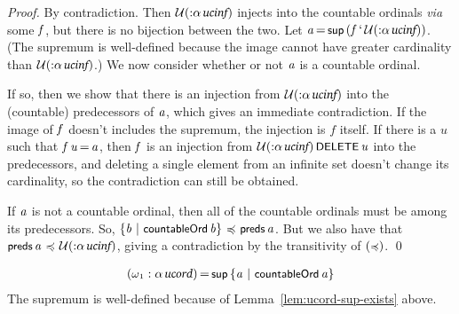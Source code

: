\documentclass[11pt]{llncs}
\renewcommand{\HOLConst}[1]{{\textsf{\upshape\small #1}}}
\renewcommand{\HOLTyOp}[1]{\mbox{\fontencoding{T1}\fontfamily{bch}\fontseries{m}\fontshape{it}\fontsize{9.5}{10}\selectfont #1}}
\renewcommand{\HOLinline}[1]{\ensuremath{#1}}
\newenvironment{holmath}{\begin{displaymath}\begin{array}{l}}{\end{array}\end{displaymath}\ignorespacesafterend}
\begin{document}
\begin{proof}
By contradiction.
Then \HOLinline{\ensuremath{\cal{U}}(\ensuremath{{:}}\ensuremath{\alpha}\,\HOLTyOp{ucinf})} injects into the countable ordinals \emph{via} some \HOLinline{\HOLFreeVar{f}}, but there is no bijection between the two.
Let \HOLinline{\HOLFreeVar{a}\,{\ensuremath{=}}\,\HOLConst{sup}\,(\HOLFreeVar{f}\,\textrm{`}\,\ensuremath{\cal{U}}(\ensuremath{{:}}\ensuremath{\alpha}\,\HOLTyOp{ucinf}))}.
(The supremum is well-defined because the image cannot have greater cardinality than \HOLinline{\ensuremath{\cal{U}}(\ensuremath{{:}}\ensuremath{\alpha}\,\HOLTyOp{ucinf})}.)
We now consider whether or not \HOLinline{\HOLFreeVar{a}} is a countable ordinal.

If so, then we show that there is an injection from \HOLinline{\ensuremath{\cal{U}}(\ensuremath{{:}}\ensuremath{\alpha}\,\HOLTyOp{ucinf})} into the (countable) predecessors of \HOLinline{\HOLFreeVar{a}}, which gives an immediate contradiction.
If the image of \HOLinline{\HOLFreeVar{f}} doesn't includes the supremum, the injection is $f$ itself.
If there is a $u$ such that \HOLinline{\HOLFreeVar{f}\,\HOLFreeVar{u}\,{\ensuremath{=}}\,\HOLFreeVar{a}}, then \HOLinline{\HOLFreeVar{f}} is an injection from \HOLinline{\ensuremath{\cal{U}}(\ensuremath{{:}}\ensuremath{\alpha}\,\HOLTyOp{ucinf})\,\HOLConst{DELETE}\,\HOLFreeVar{u}} into the predecessors, and deleting a single element from an infinite set doesn't change its cardinality, so the contradiction can still be obtained.

If \HOLinline{\HOLFreeVar{a}} is not a countable ordinal, then all of the countable ordinals must be among its predecessors.
So, \HOLinline{\ensuremath{{\{}}\HOLBoundVar{b}\,\ensuremath{{\,\mid\,}}\,\HOLConst{countableOrd}\,\HOLBoundVar{b}\ensuremath{{\}}}\,\ensuremath{{\,\HOLTokenIsPrefix\,}}\,\HOLConst{preds}\,\HOLFreeVar{a}}.
But we also have that \HOLinline{\HOLConst{preds}\,\HOLFreeVar{a}\,\ensuremath{{\,\HOLTokenIsPrefix\,}}\,\ensuremath{\cal{U}}(\ensuremath{{:}}\ensuremath{\alpha}\,\HOLTyOp{ucinf})}, giving a contradiction by the transitivity of \HOLinline{(\HOLConst{\HOLTokenIsPrefix{}})}.
\qed
\end{proof}

\begin{definition}
\label{defn:omega1}
\begin{holmath}
(\HOLConst{\ensuremath{\omega}\ensuremath{\sb{1}}} :\ensuremath{\alpha}\,\HOLTyOp{ucord})\,{\ensuremath{=}}\,\HOLConst{sup}\,\ensuremath{{\{}}\HOLBoundVar{a}\,\ensuremath{{\,\mid\,}}\,\HOLConst{countableOrd}\,\HOLBoundVar{a}\ensuremath{{\}}}
\end{holmath}
The supremum is well-defined because of Lemma~\ref{lem:ucord-sup-exists} above.
\end{definition}
\end{document}
